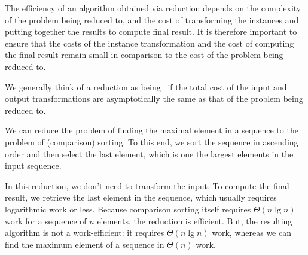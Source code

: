 \begin{cluster}
\label{grp:gr:design::reduction::efficiency}

\begin{gram}
\label{gr:design::reduction::efficiency}

The efficiency of an algorithm obtained via reduction depends on the
complexity of the problem being reduced to, and the cost of
transforming the instances and putting together the results to compute
final result.
It is therefore important to ensure that the costs of the instance
transformation and the cost of computing the final result remain small in
comparison to the cost of the problem being reduced to.

We generally think of a reduction as being~ if the
total cost of the input and output transformations are asymptotically
the same as that of the problem being reduced to.

\end{gram}
\end{cluster}

\begin{cluster}
\label{grp:xmpl:design::basics::reduction-from-maximal-to-sorting}

\begin{example}
\label{xmpl:design::basics::reduction-from-maximal-to-sorting}
  We can reduce the problem of finding the maximal element in a
  sequence to the problem of (comparison) sorting.
To this end, we sort the sequence in ascending order and then select
the last element, which is one the largest elements in the input
sequence.  

In this reduction, we don't need to transform the input.
To compute the final result, we retrieve the last element in the
sequence, which usually requires logarithmic work or less.
Because comparison sorting itself requires $\Theta(n\lg{n})$ work for
a sequence of $n$ elements, the reduction is efficient.
But, the resulting algorithm is not a work-efficient: it requires
$\Theta(n\lg{n})$ work, whereas we can find the maximum element of a
sequence in $\Theta(n)$ work.

\end{example}
\end{cluster}

